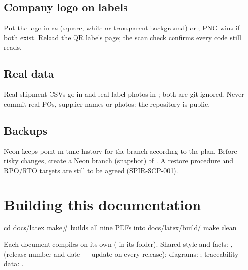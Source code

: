 \documentclass[11pt,a4paper]{article}
\newenvironment{cmd}{\begin{commandbox}\obeylines}{\end{commandbox}}
\begin{document}
\subsection{Company logo on labels}
Put the logo in  as  (square, white or transparent background) or
; PNG wins if both exist. Reload the QR labels page; the scan check confirms every code still reads.

\subsection{Real data}
Real shipment CSVs go in  and real label photos in ; both are
git-ignored. Never commit real POs, supplier names or photos: the repository is public.

\subsection{Backups}
Neon keeps point-in-time history for the branch according to the plan. Before risky changes, create a Neon branch
(snapshot) of . A restore procedure and RPO/RTO targets are still to be agreed (SPIR-SCP-001).

\section{Building this documentation}
\begin{cmd}
cd docs/latex
make\qquad\qquad\# builds all nine PDFs into docs/latex/build/
make clean
\end{cmd}
Each document compiles on its own ( in its folder). Shared style and facts:
,  (release number and date --- update on every release);
diagrams: ; traceability data: .
\end{document}
